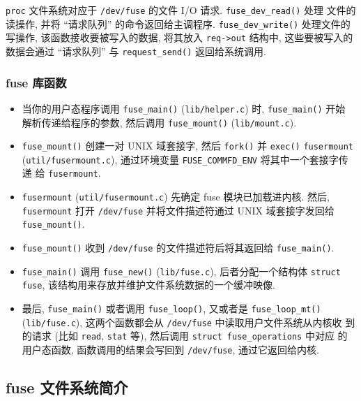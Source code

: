 \documentclass[nofonts]{ctexart}
\begin{document}
\texttt{proc} 文件系统对应于 \texttt{/dev/fuse} 的文件 I/O 请求.
\texttt{fuse\_dev\_read()} 处理 文件的读操作, 并将 ``请求队列''
的命令返回给主调程序. \texttt{fuse\_dev\_write()} 处理文件的写操作,
该函数接收要被写入的数据, 将其放入 \texttt{req-\textgreater{}out}
结构中, 这些要被写入的数据会通过 ``请求队列'' 与
\texttt{request\_send()} 返回给系统调用.

\subsubsection{fuse 库函数}\label{fuse-ux5e93ux51fdux6570}

\begin{itemize}
\item
  当你的用户态程序调用 \texttt{fuse\_main()} (\texttt{lib/helper.c}) 时,
  \texttt{fuse\_main()} 开始 解析传递给程序的参数, 然后调用
  \texttt{fuse\_mount()} (\texttt{lib/mount.c}).
\item
  \texttt{fuse\_mount()} 创建一对 UNIX 域套接字, 然后 \texttt{fork()} 并
  \texttt{exec()} \texttt{fusermount} (\texttt{util/fusermount.c}),
  通过环境变量 \texttt{FUSE\_COMMFD\_ENV} 将其中一个套接字传递 给
  \texttt{fusermount}.
\item
  \texttt{fusermount} (\texttt{util/fusermount.c}) 先确定 fuse
  模块已加载进内核. 然后, \texttt{fusermount} 打开 \texttt{/dev/fuse}
  并将文件描述符通过 UNIX 域套接字发回给 \texttt{fuse\_mount()}.
\item
  \texttt{fuse\_mount()} 收到 \texttt{/dev/fuse}
  的文件描述符后将其返回给 \texttt{fuse\_main()}.
\item
  \texttt{fuse\_main()} 调用 \texttt{fuse\_new()} (\texttt{lib/fuse.c}),
  后者分配一个结构体 \texttt{struct fuse},
  该结构用来存放并维护文件系统数据的一个缓冲映像.
\item
  最后, \texttt{fuse\_main()} 或者调用 \texttt{fuse\_loop()}, 又或者是
  \texttt{fuse\_loop\_mt()} (\texttt{lib/fuse.c}), 这两个函数都会从
  \texttt{/dev/fuse} 中读取用户文件系统从内核收 到的请求 (比如
  \texttt{read}, \texttt{stat} 等), 然后调用
  \texttt{struct fuse\_operations} 中对应 的用户态函数,
  函数调用的结果会写回到 \texttt{/dev/fuse}, 通过它返回给内核.
\end{itemize}

\subsection{fuse 文件系统简介}
\label{fuse-ux6587ux4ef6ux7cfbux7edfux7b80ux4ecb}
\end{document}
